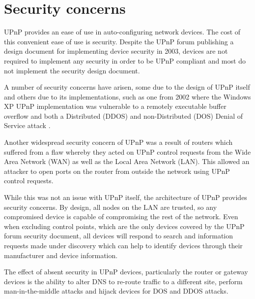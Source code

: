 \section{Security concerns}

UPnP provides an ease of use in auto-configuring network devices. The cost of this convenient ease of use is security. Despite the UPnP forum publishing a design document for implementing device security in 2003\cite{upnp-security}, devices are not required to implement any security in order to be UPnP compliant\cite{selen2006upnp} \cite{haque2007upnp} and most do not implement the security design document\cite{selen2006upnp}.

A number of security concerns have arisen, some due to the design of UPnP itself and others due to its implementations, such as one from 2002 where the Windows XP UPnP implementation was vulnerable to a remotely executable buffer overflow and both a Distributed (DDOS) and non-Distributed (DOS) Denial of Service attack\cite{winxp-upnp-flaw} \cite{haque2007upnp}.

Another widespread security concern of UPnP was a result of routers which suffered from a flaw whereby they acted on UPnP control requests from the Wide Area Network (WAN)\cite{wan} as well as the Local Area Network (LAN)\cite{lan}. This allowed an attacker to open ports on the router from outside the network using UPnP control requests.

While this was not an issue with UPnP itself, the architecture of UPnP provides security concerns. By design, all nodes on the LAN are trusted, so any compromised device is capable of compromising the rest of the network. Even when excluding control points, which are the only devices covered by the UPnP forum security document\cite{upnp-security}, all devices will respond to search and information requests made under discovery which can help to identify devices through their manufacturer and device information.

The effect of absent security in UPnP devices, particularly the router or gateway devices is the ability to alter DNS to re-route traffic to a different site, perform man-in-the-middle attacks\cite{man-in-the-middle} and hijack devices for DOS and DDOS attacks\cite{akamai-ddos}.